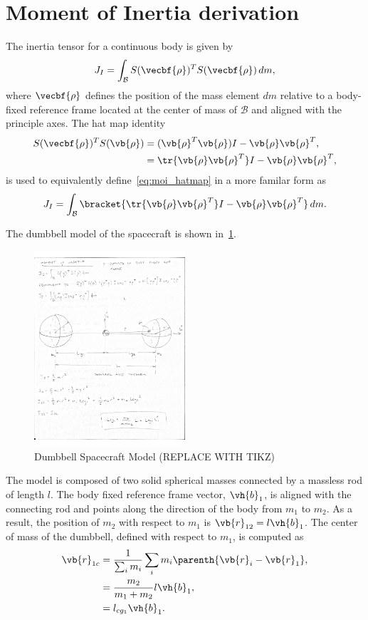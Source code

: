 \documentclass[11pt, reqno]{article}    %
\begin{document}
\section[Moment of Inertia]{Moment of Inertia derivation}\label{sec:moi_derivation}
The inertia tensor for a continuous body is given by
\begin{align}\label{eq:moi_hatmap}
    J_I = \int_\mathcal{B} S(\vecbf{\rho})^T S(\vecbf{\rho}) \, dm ,
\end{align}
where \( \vecbf{\rho}\) defines the position of the mass element \( dm \) relative to a body-fixed reference frame located at the center of mass of \( \mathcal{B} \) and aligned with the principle axes.
The hat map identity
\begin{align*}
    S(\vecbf{\rho})^T S(\vb{\rho}) &= (\vb{\rho}^T\vb{\rho}) I - \vb{\rho}\vb{\rho}^T , \\
    &= \tr{\vb{\rho}\vb{\rho}^T} I - \vb{\rho}\vb{\rho}^T ,
\end{align*}
is used to equivalently define~\cref{eq:moi_hatmap} in a more familar form as
\begin{align}\label{eq:moi}
    J_I = \int_{\mathcal{B}} \bracket{\tr{\vb{\rho}\vb{\rho}^T} I - \vb{\rho}\vb{\rho}^T} \, dm .
\end{align}

The dumbbell model of the spacecraft is shown in~\cref{fig:dumbbell_sc}.
\begin{figure}
    \centering
    \includegraphics[width=0.5\textwidth]{figures/dumbbell_model.pdf}
    \caption{Dumbbell Spacecraft Model (REPLACE WITH TIKZ)\label{fig:dumbbell_sc}}
\end{figure}
The model is composed of two solid spherical masses connected by a massless rod of length \( l\). 
The body fixed reference frame vector, \( \vh{b}_1\), is aligned with the connecting rod and points along the direction of the body from \( m_1 \) to \( m_2\).
As a result, the position of \( m_2 \) with respect to \( m_1\) is \( \vb{r}_{12} = l \vh{b}_1\).
The center of mass of the dumbbell, defined with respect to \( m_1\), is computed as
\begin{align}\label{eqn:com}
    \vb{r}_{1c} &= \frac{1}{\sum_i m_i} \sum_i m_i \parenth{\vb{r}_i - \vb{r}_1},\\
    &= \frac{m_2}{m_1+m_2} l \vh{b}_1 , \\
    &= l_{cg_{1}} \vh{b}_1 .
\end{align}
\end{document}
